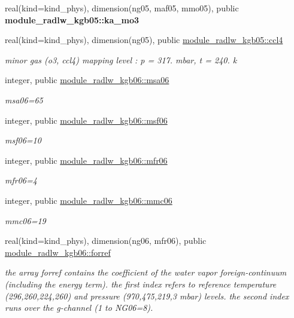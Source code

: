 \begin{DoxyCompactItemize}
real(kind=kind\+\_\+phys), dimension(ng05, maf05, mmo05), public {\bfseries module\+\_\+radlw\+\_\+kgb05\+::ka\+\_\+mo3}
\item 
real(kind=kind\+\_\+phys), dimension(ng05), public \hyperlink{group__module__radlw__kgbnn_ga15c6b3bfa9d8cbf20099dd4f364444b5}{module\+\_\+radlw\+\_\+kgb05\+::ccl4}
\begin{DoxyCompactList}\small\item\em minor gas (o3, ccl4) mapping level \+: p = 317. mbar, t = 240. k \end{DoxyCompactList}\item 
\mbox{\label{namespacemodule__radlw__kgb06_add7b5d0d3ea44e1e677948c33e870333}} 
integer, public \hyperlink{namespacemodule__radlw__kgb06_add7b5d0d3ea44e1e677948c33e870333}{module\+\_\+radlw\+\_\+kgb06\+::msa06}
\begin{DoxyCompactList}\small\item\em msa06=65 \end{DoxyCompactList}\item 
integer, public \hyperlink{group__module__radlw__kgbnn_ga65f808aeb87457d383dd7f9366878fb9}{module\+\_\+radlw\+\_\+kgb06\+::msf06}
\begin{DoxyCompactList}\small\item\em msf06=10 \end{DoxyCompactList}\item 
integer, public \hyperlink{group__module__radlw__kgbnn_gaaf1f13cdb5c2888b416a91e8b17e41d8}{module\+\_\+radlw\+\_\+kgb06\+::mfr06}
\begin{DoxyCompactList}\small\item\em mfr06=4 \end{DoxyCompactList}\item 
integer, public \hyperlink{group__module__radlw__kgbnn_gaf7a377cb66fd48348789c20f5a31dec6}{module\+\_\+radlw\+\_\+kgb06\+::mmc06}
\begin{DoxyCompactList}\small\item\em mmc06=19 \end{DoxyCompactList}\item 
real(kind=kind\+\_\+phys), dimension(ng06, mfr06), public \hyperlink{group__module__radlw__kgbnn_ga6a0467b666bc75f90ae58fa4f58f07f0}{module\+\_\+radlw\+\_\+kgb06\+::forref}
\begin{DoxyCompactList}\small\item\em the array forref contains the coefficient of the water vapor foreign-\/continuum (including the energy term). the first index refers to reference temperature (296,260,224,260) and pressure (970,475,219,3 mbar) levels. the second index runs over the g-\/channel (1 to N\+G06=8). \end{DoxyCompactList}\item 

\end{DoxyCompactItemize}
